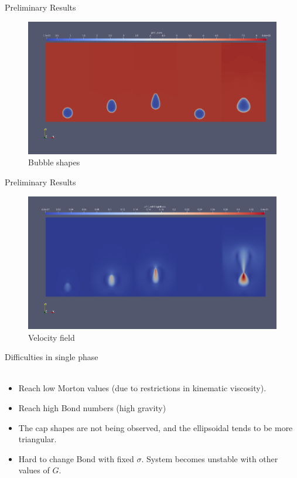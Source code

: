 \documentclass[8pt]{beamer}
\begin{document}
	\begin{frame}{Preliminary Results}
		\begin{figure}
			\centering
			\includegraphics[scale=0.2]{pics/risingCompDen.png}
			\\{\tiny \justifying Bubble shapes}
		\end{figure}
	\end{frame}
	
	\begin{frame}{Preliminary Results}
		\begin{figure}
			\centering
			\includegraphics[scale=0.2]{pics/risingCompVel.png}
			\\{\tiny \justifying Velocity field}
		\end{figure}
	\end{frame}
	
	\begin{frame}{Difficulties in single phase}
		\textbf{}\\~\\
		\begin{itemize}
			\item Reach low Morton values (due to restrictions in kinematic viscosity).
			\item Reach high Bond numbers (high gravity)
			\item The cap shapes are not being observed, and the ellipsoidal tends to be more triangular.
			\item Hard to change Bond with fixed $\sigma$. System becomes unstable with other values of $G$.
		\end{itemize}
	\end{frame}
	
\end{document}
